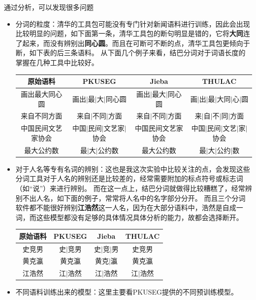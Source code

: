 \documentclass[logo,reportComp]{thesis}
\begin{document}
通过分析，可以发现很多问题
\begin{itemize}
	\item 分词的粒度：清华的工具包可能没有专门针对新闻语料进行训练，因此会出现比较明显的问题，如下面第一条，清华工具包的断句明显是错的，它将\textbf{大同}连了起来，而没有辨别出\textbf{同心圆}。而且在可断可不断的点，清华工具包更倾向于断，如下表的后三条语料。
	从下面几个例子来看，结巴分词对于词语长度的掌握在几种工具中比较好。
	\begin{center}
	\begin{tabular}{cccc}\hline
	原始语料 & PKUSEG & Jieba & THULAC\\\hline
	画出最大同心圆 & 画出$\mid$最$\mid$大$\mid$同心圆 & 画出$\mid$最大$\mid$同心圆 & 画$\mid$出$\mid$最$\mid$大同$\mid$心$\mid$圆\\
	来自不同方面 & 来自$\mid$不同$\mid$方面 & 来自$\mid$不同$\mid$方面 & 来$\mid$自$\mid$不$\mid$同$\mid$方面\\
	中国民间文艺家协会 & 中国$\mid$民间$\mid$文艺家$\mid$协会  & 中国民间文艺家协会 & 中国$\mid$民间$\mid$文艺$\mid$家$\mid$协会\\
	最大公约数 & 最$\mid$大$\mid$公约数 & 最大公约数 & 最$\mid$大$\mid$公约$\mid$数\\
	\hline
	\end{tabular}
	\end{center}
	\item 对于人名等专有名词的辨别：这也是我这次实验中比较关注的点，会发现这些分词工具对于人名的辨别还是比较差的，经常需要附加的标点符号或标志词（如“说”）来进行辨别。
	而在这一点上，结巴分词就做得比较糟糕了，经常辨别不出人名，如下面的例子，常常将人名中的名字部分分开。
	而且三个分词软件都不能很好辨别\textbf{江浩然}这一人名，因为在大部分语料中，浩然是自成一词，而这些模型都没有足够的具体情况具体分析的能力，故都会选择断开。
	\begin{center}
	\begin{tabular}{cccc}\hline
	原始语料 & PKUSEG & Jieba & THULAC\\\hline
	史竞男 & 史$\mid$竞男 & 史$\mid$竞$\mid$男 & 史竞男\\
	黄克瀛 & 黄克瀛 & 黄克$\mid$瀛 & 黄克瀛\\
	江浩然 & 江$\mid$浩然 & 江$\mid$浩然 & 江$\mid$浩然\\
	\hline
	\end{tabular}
	\end{center}
	\item 不同语料训练出来的模型：这里主要看PKUSEG提供的不同预训练模型。
\begin{figure}[H]

\end{figure}
\end{itemize}
\end{document}
